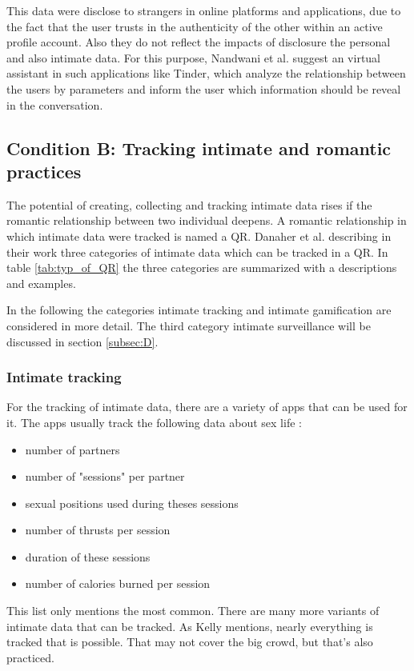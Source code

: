 This data were disclose to strangers in online platforms and applications, due to the fact that the user trusts in the authenticity of the other within an active profile account. Also they do not reflect the impacts of disclosure the personal and also intimate data. For this purpose, Nandwani et al. \cite{10.1007/978-3-319-61542-4_32} suggest an virtual assistant in such applications like Tinder, which analyze the relationship between the users by parameters and inform the user which information should be reveal in the conversation.

\subsection[Condition B]{Condition B: Tracking intimate and romantic practices}
\label{subsec:B}
The potential of creating, collecting and tracking intimate data rises if the romantic relationship between two individual deepens. A romantic relationship in which intimate data were tracked is named a \ac{QR}.
Danaher et al. \cite{doi:10.1080/15265161.2017.1409823} describing in their work three categories of intimate data which can be tracked in a \acs{QR}. In table \ref{tab:typ_of_QR} the three categories are summarized with a descriptions and examples.



In the following the categories intimate tracking and intimate gamification are considered in more detail.
The third category intimate surveillance will be discussed in section \ref{subsec:D}.

\subsubsection{Intimate tracking}
For the tracking of intimate data, there are a variety of apps that can be used for it.
The apps usually track the following data about sex life \cite{doi:10.1080/15265161.2017.1409823}: 
\begin{itemize}
	\item number of partners
	\item number of "sessions" per partner
	\item sexual positions used during theses sessions
	\item number of thrusts per session
	\item duration of these sessions
	\item number of calories burned per session 
\end{itemize}
This list only mentions the most common. There are many more variants of intimate data that can be tracked. As Kelly \cite{kelly2017inevitable} mentions, nearly everything is tracked that is possible. That may not cover the big crowd, but that's also practiced.

